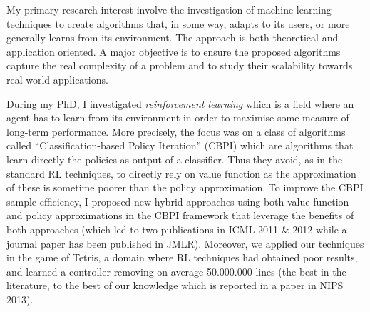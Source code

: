 My primary research interest involve the investigation of machine learning techniques to create algorithms that, in some way, adapts to its users, or more generally learns from its environment. The approach is both theoretical and application oriented. A major objective is to ensure the proposed algorithms capture the real complexity of a problem and to study  their scalability towards real-world applications. 

During my PhD, I investigated \textit{reinforcement learning}  which is a field where an agent has to learn from its environment in order to maximise some measure of long-term performance. More precisely, the focus was on a class of algorithms called ``Classification-based Policy Iteration'' (CBPI) which are algorithms that learn directly the policies as output of a classifier. Thus they avoid, as in the standard RL techniques, to directly rely on  value function as the approximation of these is sometime poorer than the policy approximation. To improve the CBPI sample-efficiency, I proposed new hybrid approaches using both value function and policy approximations in the CBPI framework that leverage the benefits of both approaches (which led to two publications in ICML 2011 \& 2012 while a journal paper has been published in JMLR). Moreover, we applied our techniques in the game of Tetris, a domain where RL techniques had obtained poor results, and learned a controller removing on average 50.000.000 lines (the best in the literature, to the best of our knowledge which is reported in a paper in NIPS 2013).

